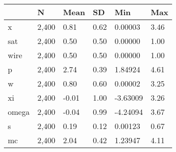 \begin{table}[htbp]
\begin{tabular}{|l|l|l|l|l|l|}\hline  
 & N  & Mean  & SD  & Min  & Max  \\ \hline  
x &     2,400 &      0.81 &      0.62 &   0.00003 &      3.46 \\ \hline 
sat &     2,400 &      0.50 &      0.50 &   0.00000 &      1.00 \\ \hline 
wire &     2,400 &      0.50 &      0.50 &   0.00000 &      1.00 \\ \hline 
p &     2,400 &      2.74 &      0.39 &   1.84924 &      4.61 \\ \hline 
w &     2,400 &      0.80 &      0.60 &   0.00002 &      3.25 \\ \hline 
xi &     2,400 &     -0.01 &      1.00 &  -3.63009 &      3.26 \\ \hline 
omega &     2,400 &     -0.04 &      0.99 &  -4.24094 &      3.67 \\ \hline 
s &     2,400 &      0.19 &      0.12 &   0.00123 &      0.67 \\ \hline 
mc &     2,400 &      2.04 &      0.42 &   1.23947 &      4.11 \\ \hline 
  \end{tabular}
\end{table}
